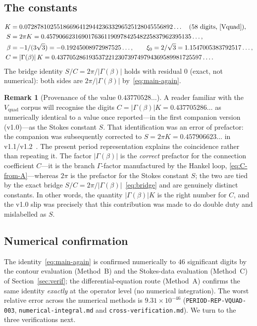 \documentclass[11pt,reqno]{amsart}
\renewcommand{\_}{\vquadorigunderscore\allowbreak}
\theoremstyle{plain}
\theoremstyle{definition}
\newtheorem{remark}[theorem]{Remark}
\newcommand{\Vquad}{V_{\mathrm{quad}}}
\newcommand{\xizero}{\xi_0}
\providecommand{\C}{}\renewcommand{\C}{C}
\begin{document}
\subsection{The constants}
{\small
\begin{equation}\label{eq:constants}
\begin{aligned}
  K&=0.0728781025518669641294423633296525128045556892\ldots\quad(\text{58 digits, \cite{Vquad}}),\\
  S&=2\pi K=0.457906623169017636119097842548225837962395135\ldots,\\
  \beta&=-1/(3\sqrt3)=-0.19245008972987525\ldots,\qquad \xizero=2/\sqrt3=1.1547005383792517\ldots,\\
  \C&=\lvert\Gamma(\beta)\rvert\,K=0.437705286193537221230739749794369589981725597\ldots .
\end{aligned}
\end{equation}
}
The bridge identity $S/\C=2\pi/\lvert\Gamma(\beta)\rvert$ holds with residual $0$ (exact, not
numerical): both sides are $2\pi/\lvert\Gamma(\beta)\rvert$ by~\eqref{eq:main-again}.

\begin{remark}[Provenance of the value $0.43770528\ldots$]\label{rmk:provenance-C}
A reader familiar with the $\Vquad$ corpus will recognise the digits
$\C=\lvert\Gamma(\beta)\rvert K=0.437705286\ldots$ as numerically identical to a value once
reported---in the first companion version (v1.0)---as the Stokes constant $S$. That identification
was an error of prefactor: the companion was subsequently corrected to $S=2\pi K=0.457906623\ldots$
in v1.1/v1.2~\cite{StokesNote}. The present period representation explains the coincidence rather
than repeating it. The factor $\lvert\Gamma(\beta)\rvert$ is the \emph{correct} prefactor for the
connection coefficient $\C$---it is the branch $\Gamma$-factor manufactured by the Hankel loop,
\eqref{eq:C-from-A}---whereas $2\pi$ is the prefactor for the Stokes constant $S$; the two are tied
by the exact bridge $S/\C=2\pi/\lvert\Gamma(\beta)\rvert$~\eqref{eq:bridge} and are genuinely
distinct constants. In other words, the quantity $\lvert\Gamma(\beta)\rvert K$ is the right number
for $\C$, and the v1.0 slip was precisely that this contribution was made to do double duty and
mislabelled as $S$.
\end{remark}

\subsection{Numerical confirmation}
The identity~\eqref{eq:main-again} is confirmed numerically to $46$ significant digits by the
contour evaluation (Method~B) and the Stokes-data evaluation (Method~C) of
Section~\ref{sec:verif}; the differential-equation route (Method~A) confirms the same identity
\emph{exactly} at the operator level (no numerical integration). The worst relative error across
the numerical methods is $9.31\times10^{-46}$
(\texttt{PERIOD-REP-VQUAD-003}, \texttt{numerical-integral.md} and
\texttt{cross-verification.md}). We turn to the three verifications next.
\end{document}
